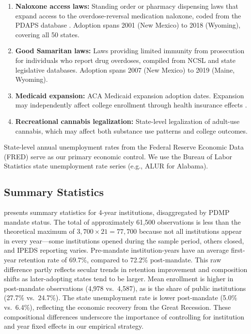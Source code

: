 \documentclass[12pt]{article}
\begin{document}
\begin{enumerate}
\item \textbf{Naloxone access laws:} Standing order or pharmacy dispensing laws that expand access to the overdose-reversal medication naloxone, coded from the PDAPS database \citep{davis2019laws}. Adoption spans 2001 (New Mexico) to 2018 (Wyoming), covering all 50 states.
\item \textbf{Good Samaritan laws:} Laws providing limited immunity from prosecution for individuals who report drug overdoses, compiled from NCSL and state legislative databases. Adoption spans 2007 (New Mexico) to 2019 (Maine, Wyoming).
\item \textbf{Medicaid expansion:} ACA Medicaid expansion adoption dates. Expansion may independently affect college enrollment through health insurance effects \citep{simon2017opioids}.
\item \textbf{Recreational cannabis legalization:} State-level legalization of adult-use cannabis, which may affect both substance use patterns and college outcomes.
\end{enumerate}

State-level annual unemployment rates from the Federal Reserve Economic Data (FRED) serve as our primary economic control. We use the Bureau of Labor Statistics state unemployment rate series (e.g., ALUR for Alabama).

\subsection{Summary Statistics}

 presents summary statistics for 4-year institutions, disaggregated by PDMP mandate status. The total of approximately 61,500 observations is less than the theoretical maximum of $3{,}700 \times 21 = 77{,}700$ because not all institutions appear in every year---some institutions opened during the sample period, others closed, and IPEDS reporting varies. Pre-mandate institution-years have an average first-year retention rate of 69.7\%, compared to 72.2\% post-mandate. This raw difference partly reflects secular trends in retention improvement and composition shifts as later-adopting states tend to be larger. Mean enrollment is higher in post-mandate observations (4,978 vs.\ 4,587), as is the share of public institutions (27.7\% vs.\ 24.7\%). The state unemployment rate is lower post-mandate (5.0\% vs.\ 6.4\%), reflecting the economic recovery from the Great Recession. These compositional differences underscore the importance of controlling for institution and year fixed effects in our empirical strategy.
\end{document}
